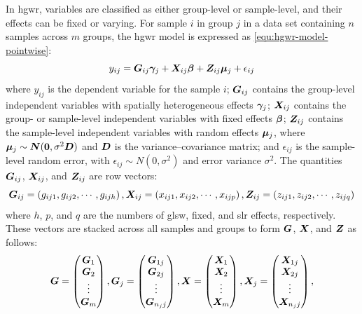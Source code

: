 \documentclass[times]{interact}
\theoremstyle{plain}%
\theoremstyle{definition}
\theoremstyle{remark}
\begin{document}
In \gls{hgwr}, variables are classified as either group-level or sample-level, and their effects can be fixed or varying.
For sample $i$ in group $j$ in a data set containing $n$ samples across $m$ groups, the \gls{hgwr} model is expressed as \autoref{equ:hgwr-model-pointwise}:
\begin{equation}\label{equ:hgwr-model-pointwise}
  y_{ij} = \bm{G}_{ij}\bm{\gamma}_{j} + \bm{X}_{ij}\bm{\beta} + \bm{Z}_{ij}\bm{\mu}_{j} + \epsilon_{ij}
\end{equation}
where $y_{ij}$ is the dependent variable for the sample $i$;
$\bm{G}_{ij}$ contains the group-level independent variables with spatially heterogeneous effects $\bm{\gamma}_{j}$;
$\bm{X}_{ij}$ contains the group- or sample-level independent variables with fixed effects $\bm{\beta}$;
$\bm{Z}_{ij}$ contains the sample-level independent variables with random effects $\bm{\mu}_{j}$, where $\bm{\mu}_{j} \sim \bm{N}(\bm{0}, \sigma^2\bm{D})$ and $\bm{D}$ is the variance--covariance matrix;
and $\epsilon_{ij}$ is the sample-level random error, with $\epsilon_{ij} \sim N(0, \sigma^2)$ and error variance $\sigma^2$.
The quantities $\bm{G}_{ij}$, $\bm{X}_{ij}$, and $\bm{Z}_{ij}$ are row vectors:
\begin{equation*}
  \bm{G}_{ij} = \left(g_{ij1}, g_{ij2}, \cdots, g_{ijh}\right),
  \bm{X}_{ij} = \left(x_{ij1}, x_{ij2}, \cdots, x_{ijp}\right),
  \bm{Z}_{ij} = \left(z_{ij1}, z_{ij2}, \cdots, z_{ijq}\right)
\end{equation*}
where $h$, $p$, and $q$ are the numbers of \gls{glsw}, fixed, and \gls{slr} effects, respectively.
These vectors are stacked across all samples and groups to form $\bm{G}$, $\bm{X}$, and $\bm{Z}$ as follows:
\begin{equation*}
  \bm{G} = \begin{pmatrix}
    \bm{G}_1 \\ \bm{G}_2 \\ \vdots \\ \bm{G}_m
  \end{pmatrix},
  \bm{G}_j = \begin{pmatrix}
    \bm{G}_{1j} \\ \bm{G}_{2j} \\ \vdots \\ \bm{G}_{n_{j}j} \\
  \end{pmatrix},
  \bm{X} = \begin{pmatrix}
    \bm{X}_1 \\ \bm{X}_2 \\ \vdots \\ \bm{X}_m
  \end{pmatrix},
  \bm{X}_j = \begin{pmatrix}
    \bm{X}_{1j} \\ \bm{X}_{2j} \\ \vdots \\ \bm{X}_{n_{j}j} \\
  \end{pmatrix},
\end{equation*}
\end{document}
